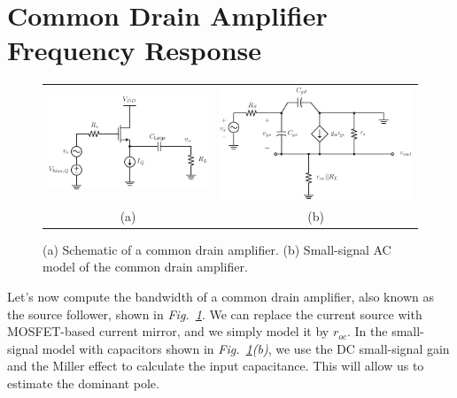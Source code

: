 \section{Common Drain Amplifier Frequency Response}
\begin{figure}[tb]
\centering
\begin{tabular}{cc}
\includegraphics[scale=.75]{cd_amp_load} &
\includegraphics[scale=.75]{cd_amp_ss_cap}\\
(a) & (b)\\
\end{tabular}
\caption{(a) Schematic of a common drain amplifier.  (b) Small-signal AC model of the common drain amplifier.}
\label{fig:cd_amp_load}
\end{figure}
Let's now compute the bandwidth of a common drain amplifier, also known as the source follower, shown in \emph{Fig.~\ref{fig:cd_amp_load}}.  We can replace the current source with MOSFET-based current mirror, and we simply model it by $r_{oc}$.  In the small-signal model with capacitors shown in \emph{Fig.~\ref{fig:cd_amp_load}(b)}, we use the DC small-signal gain and the Miller effect to calculate the input capacitance.  This will allow us to estimate the dominant pole.
